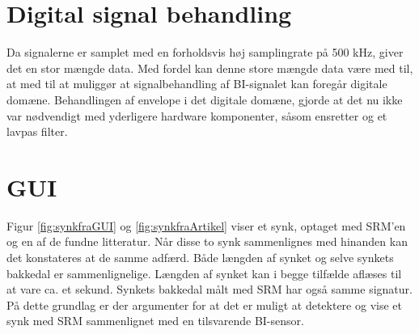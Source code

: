 \section{Digital signal behandling}
Da signalerne er samplet med en forholdsvis høj samplingrate på 500 kHz, giver det en stor mængde data. Med fordel kan denne store mængde data være med til, at med til at muliggør at signalbehandling af BI-signalet kan foregår  digitale domæne. Behandlingen af envelope i det digitale domæne, gjorde at det nu ikke var nødvendigt med yderligere hardware komponenter, såsom ensretter og et lavpas filter.

\section{GUI}

Figur \ref{fig:synkfraGUI} og \ref{fig:synkfraArtikel} viser et synk, optaget med SRM'en og en af de fundne litteratur. Når disse to synk sammenlignes med hinanden kan det konstateres at de samme adfærd. Både længden af synket og selve synkets bakkedal er sammenlignelige. Længden af synket kan i begge tilfælde aflæses til at vare ca. et sekund. Synkets bakkedal målt med SRM har også samme signatur. På dette grundlag er der argumenter for at det er muligt at detektere og vise et synk med SRM sammenlignet med en tilsvarende BI-sensor.

